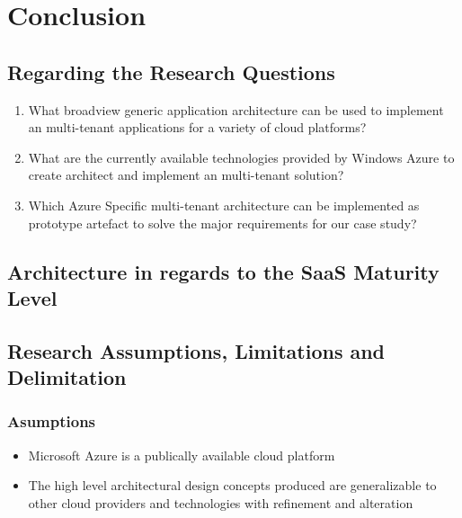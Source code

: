 \chapter{Conclusion}


\section{Regarding the Research Questions}

\begin{enumerate}
\item What broadview generic application architecture can be used to implement an multi-tenant applications for a variety of cloud platforms?
\item What are the currently available technologies provided by Windows Azure to create architect and implement an multi-tenant solution?
\item Which Azure Specific multi-tenant architecture can be implemented as prototype artefact to solve the major requirements for our case study?
\end{enumerate}

\section{Architecture in regards to the SaaS Maturity Level}


\section{Research Assumptions, Limitations and Delimitation}

\subsection{Asumptions}
\begin{itemize}
\item Microsoft Azure is a publically available cloud platform
\item The high level architectural design concepts produced are generalizable to other cloud providers and technologies with refinement and alteration
\end{itemize}

